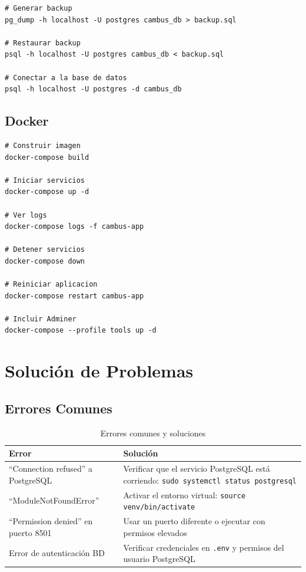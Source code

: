 \documentclass[12pt,a4paper]{article}
\begin{document}
\begin{lstlisting}[style=bash]
# Generar backup
pg_dump -h localhost -U postgres cambus_db > backup.sql

# Restaurar backup
psql -h localhost -U postgres cambus_db < backup.sql

# Conectar a la base de datos
psql -h localhost -U postgres -d cambus_db
\end{lstlisting}

\subsection{Docker}

\begin{lstlisting}[style=bash]
# Construir imagen
docker-compose build

# Iniciar servicios
docker-compose up -d

# Ver logs
docker-compose logs -f cambus-app

# Detener servicios
docker-compose down

# Reiniciar aplicacion
docker-compose restart cambus-app

# Incluir Adminer
docker-compose --profile tools up -d
\end{lstlisting}

\section{Solución de Problemas}

\subsection{Errores Comunes}

\begin{table}[H]
    \centering
    \begin{tabularx}{\textwidth}{|l|X|}
        \hline
        \textbf{Error} & \textbf{Solución} \\
        \hline
        ``Connection refused'' a PostgreSQL & Verificar que el servicio PostgreSQL está corriendo: \texttt{sudo systemctl status postgresql} \\
        \hline
        ``ModuleNotFoundError'' & Activar el entorno virtual: \texttt{source venv/bin/activate} \\
        \hline
        ``Permission denied'' en puerto 8501 & Usar un puerto diferente o ejecutar con permisos elevados \\
        \hline
        Error de autenticación BD & Verificar credenciales en \texttt{.env} y permisos del usuario PostgreSQL \\
        \hline
    \end{tabularx}
    \caption{Errores comunes y soluciones}
\end{table}
\end{document}
